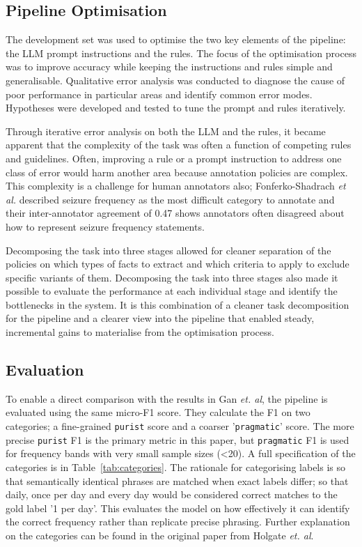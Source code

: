 \documentclass[conference]{IEEEtran}
\begin{document}
\subsection{Pipeline Optimisation}

The development set was used to optimise the two key 
elements of the pipeline: the LLM prompt instructions and 
the rules. The focus of the optimisation process was to 
improve accuracy while keeping the instructions and rules 
simple and generalisable. Qualitative error analysis was 
conducted to diagnose the cause of poor performance 
in particular areas and identify common error modes. 
Hypotheses were developed and tested to tune the 
prompt and rules iteratively. 

Through iterative error analysis on both the LLM and 
the rules, it became apparent that the complexity of the 
task was often a function of competing rules and 
guidelines. Often, improving a rule or a prompt 
instruction to address one class of error would harm 
another area because annotation policies are complex.
This complexity is a challenge for human annotators 
also; Fonferko-Shadrach \emph{et al.} described seizure
frequency as the most difficult category to annotate
and their inter-annotator agreement of 0.47 shows 
annotators often disagreed about how to represent
seizure frequency statements\cite{b4}.

Decomposing the task into three stages allowed for 
cleaner separation of the policies on which types of 
facts to extract and which criteria to apply to exclude
specific variants of them. Decomposing the task into
three stages also made it possible to evaluate the 
performance at each individual stage and identify the 
bottlenecks in the system. It is this combination of 
a cleaner task decomposition for the pipeline and a
clearer view into the pipeline that enabled steady,
incremental gains to materialise from the optimisation
process.

\subsection{Evaluation}

To enable a direct comparison with the results in 
Gan \emph{et. al}, the pipeline is evaluated using the 
same micro-F1 score. They calculate the F1 on two 
categories; a fine-grained \texttt{purist} score and a 
coarser '\texttt{pragmatic}' score. The more precise
\texttt{purist} F1 is the primary metric in this paper, 
but \texttt{pragmatic} F1 is used for frequency bands 
with very small sample sizes (\textless20). A full 
specification of the categories is in Table~\ref{tab:categories}. 
The rationale for categorising labels is so that 
semantically identical phrases are matched when 
exact labels differ; so that daily, once per day and 
every day would be considered correct matches 
to the gold label '1 per day'. This evaluates the model 
on how effectively it can identify the correct frequency 
rather than replicate precise phrasing. Further 
explanation on the categories can be found in the 
original paper from Holgate \emph{et. al}\cite{b5}.
\end{document}
